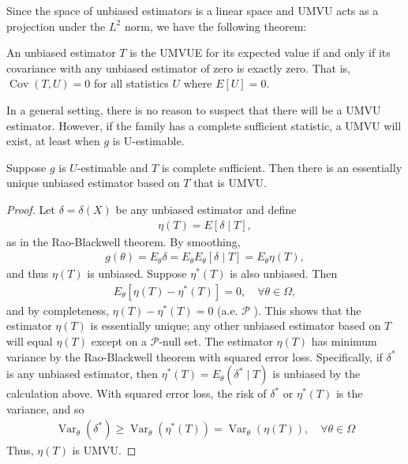 Since the space of unbiased estimators is a linear space and UMVU acts as a projection under the $L^2$ norm, we have the following theorem:
\begin{thm}
An unbiased estimator $T$ is the UMVUE for its expected value if and only if its covariance with any unbiased estimator of zero is exactly zero. That is, $\operatorname{Cov}(T, U)=0$ for all statistics $U$ where $E[U]=0$.
\end{thm}

In a general setting, there is no reason to suspect that there will be a UMVU estimator. However, if the family has a complete sufficient statistic, a UMVU will exist, at least when $g$ is U-estimable.

\begin{thm}
    Suppose $g$ is $U$-estimable and $T$ is complete sufficient. Then there is an essentially unique unbiased estimator based on $T$ that is UMVU.
\end{thm}
\begin{proof}
    Let $\delta=\delta(X)$ be any unbiased estimator and define
\begin{align*}
\eta(T)=E[\delta \mid T],
\end{align*}
as in the Rao-Blackwell theorem. By smoothing,
\begin{align*}
g(\theta)=E_\theta \delta=E_\theta E_\theta[\delta \mid T]=E_\theta \eta(T),
\end{align*}
and thus $\eta(T)$ is unbiased. Suppose $\eta^*(T)$ is also unbiased. Then
\begin{align*}
E_\theta\left[\eta(T)-\eta^*(T)\right]=0, \quad \forall \theta \in \Omega,
\end{align*}
and by completeness, $\eta(T)-\eta^*(T)=0$ (a.e. $\mathcal{P}$ ). This shows that the estimator $\eta(T)$ is essentially unique; any other unbiased estimator based on $T$ will equal $\eta(T)$ except on a $\mathcal{P}$-null set. The estimator $\eta(T)$ has minimum variance by the Rao-Blackwell theorem with squared error loss. Specifically, if $\delta^*$ is any unbiased estimator, then $\eta^*(T)=E_\theta\left(\delta^* \mid T\right)$ is unbiased by the calculation above. With squared error loss, the risk of $\delta^*$ or $\eta^*(T)$ is the variance, and so
\begin{align*}
\operatorname{Var}_\theta\left(\delta^*\right) \geq \operatorname{Var}_\theta\left(\eta^*(T)\right)=\operatorname{Var}_\theta(\eta(T)), \quad \forall \theta \in \Omega
\end{align*}
Thus, $\eta(T)$ is UMVU.
\end{proof}


